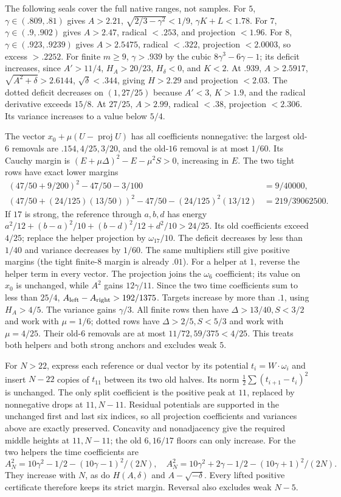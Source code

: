 \documentclass[11pt]{article}
\theoremstyle{definition}
\theoremstyle{remark}
\begin{document}
The following seals cover the full native ranges, not samples.
For $5$, $\gamma\in(.809,.81)$ gives $A>2.21$,
$\sqrt{2/3-\gamma^2}<1/9$, $\gamma K+L<1.78$.
For $7$, $\gamma\in(.9,.902)$ gives $A>2.47$, radical $<.253$,
and projection $<1.96$.
For $8$, $\gamma\in(.923,.9239)$ gives $A>2.5475$, radical
$<.322$, projection $<2.0003$, so excess $>.2252$.
For finite $m\ge9$, $\gamma>.939$ by the cubic
$8\gamma^3-6\gamma-1$; its deficit increases, since
$A'>11/4$, $H_A>20/23$, $H_\delta<0$, and $K<2$.
At $.939$, $A>2.5917$, $\sqrt{A^2+\delta}>2.6144$,
$\sqrt\delta<.344$, giving $H>2.29$ and projection $<2.03$.
The dotted deficit decreases on $(1,27/25)$ because
$A'<3$, $K>1.9$, and the radical derivative exceeds $15/8$.
At $27/25$, $A>2.99$, radical $<.38$, projection $<2.306$.
Its variance increases to a value below $5/4$.

The vector $x_0+\mu(U-\operatorname{proj}U)$ has all coefficients
nonnegative: the largest old-$6$ removals are $.154,4/25,3/20$,
and the old-$16$ removal is at most $1/60$.
Its Cauchy margin is
$(E+\mu\Delta)^2-E-\mu^2S>0$, increasing in $E$.
The two tight rows have exact lower margins
\[
\begin{aligned}
 (47/50+9/200)^2-47/50-3/100&=9/40000,\\
 (47/50+(24/125)(13/50))^2-47/50-(24/125)^2(13/12)
 &=219/39062500.
\end{aligned}
\]
If $17$ is strong, the reference through $a,b,d$ has energy
$a^2/12+(b-a)^2/10+(b-d)^2/12+d^2/10>24/25$.
Its old coefficients exceed $4/25$; replace the helper projection
by $\omega_{17}/10$. The deficit decreases by less than $1/40$
and variance decreases by $1/60$. The same multipliers still give
positive margins (the tight finite-$8$ margin is already $.01$).
For a helper at $1$, reverse the helper term in every vector.
The projection joins the $\omega_6$ coefficient; its value on $x_0$
is unchanged, while $A^2$ gains $12\gamma/11$.
Since the two time coefficients sum to less than $25/4$,
$A_{\rm left}-A_{\rm right}>192/1375$.
Targets increase by more than $.1$, using $H_A>4/5$.
The variance gains $\gamma/3$. All finite rows then have
$\Delta>13/40,S<3/2$ and work with $\mu=1/6$;
dotted rows have $\Delta>2/5,S<5/3$ and work with $\mu=4/25$.
Their old-$6$ removals are at most $11/72,59/375<4/25$.
This treats both helpers and both strong anchors and excludes weak $5$.

For $N>22$, express each reference or dual vector by its potential
$t_i=W\cdot\omega_i$ and insert $N-22$ copies of $t_{11}$
between its two old halves. Its norm
$\frac12\sum(t_{i+1}-t_i)^2$ is unchanged.
The only split coefficient is the positive peak at $11$, replaced
by nonnegative drops at $11,N-11$. Residual potentials are supported
in the unchanged first and last six indices, so all projection
coefficients and variances above are exactly preserved.
Concavity and nonadjacency give the required middle heights at
$11,N-11$; the old $6,16/17$ floors can only increase.
For the two helpers the time coefficients are
\[
 A_N^2=10\gamma^2-1/2-(10\gamma-1)^2/(2N),\quad
 A_N^2=10\gamma^2+2\gamma-1/2-(10\gamma+1)^2/(2N).
\]
They increase with $N$, as do $H(A,\delta)$ and $A-\sqrt{-\delta}$.
Every lifted positive certificate therefore keeps its strict margin.
Reversal also excludes weak $N-5$.
\end{document}
